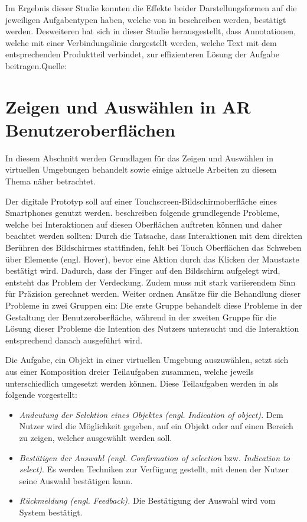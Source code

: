 Im Ergebnis dieser Studie konnten die Effekte beider Darstellungsformen auf die jeweiligen Aufgabentypen haben, welche von \citeauthor{Polys2007} in \cite{Polys2007} beschreiben werden, bestätigt werden.
Desweiteren hat sich in dieser Studie herausgestellt, dass Annotationen, welche mit einer Verbindungslinie dargestellt werden, welche Text mit dem entsprechenden Produktteil verbindet, 
zur effizienteren Lösung der Aufgabe beitragen.Quelle: \cite[S.~135]{Brandenburg2019}

\section{Zeigen und Auswählen in AR Benutzeroberflächen} \label{pointer_section}

In diesem Abschnitt werden Grundlagen für das Zeigen und Auswählen in virtuellen Umgebungen behandelt sowie einige aktuelle Arbeiten 
zu diesem Thema näher betrachtet. 

Der digitale Prototyp soll auf einer Touchscreen-Bildschirmoberfläche eines Smartphones genutzt werden.
\citeauthor{Ortega2016} beschreiben folgende grundlegende Probleme, welche bei Interaktionen auf diesen Oberflächen auftreten können und daher beachtet werden sollten:  
Durch die Tatsache, dass Interaktionen mit dem direkten Berühren des Bildschirmes stattfinden, fehlt bei Touch Oberflächen das Schweben über Elemente (engl. Hover), bevor eine Aktion durch das Klicken der Maustaste bestätigt wird. 
Dadurch, dass der Finger auf den Bildschirm aufgelegt wird, entsteht das Problem der Verdeckung. Zudem muss mit stark variierendem Sinn für Präzision gerechnet werden. Weiter ordnen \citeauthor{Ortega2016} Ansätze 
für die Behandlung dieser Probleme in zwei Gruppen ein: Die erste Gruppe behandelt diese Probleme in der Gestaltung der Benutzeroberfläche, während in der zweiten Gruppe für die Lösung dieser Probleme die Intention
des Nutzers untersucht und die Interaktion entsprechend danach ausgeführt wird. \cite[S.~205]{Ortega2016}

Die Aufgabe, ein Objekt in einer virtuellen Umgebung auszuwählen, setzt sich aus einer Komposition dreier Teilaufgaben zusammen, welche jeweils unterschiedlich umgesetzt werden können. 
Diese Teilaufgaben werden in \cite[S.~12]{Bowman1999} \cite[S.~150]{Bowman2011} als folgende vorgestellt: 

\begin{itemize}
\item \textit{Andeutung der Selektion eines Objektes (engl. Indication of object).} Dem Nutzer wird die Möglichkeit gegeben, auf ein Objekt oder auf einen Bereich zu zeigen, welcher ausgewählt werden soll.
\item \textit{Bestätigen der Auswahl (engl. Confirmation of selection} bzw. \textit{Indication to select)}. Es werden Techniken zur Verfügung gestellt, mit denen der Nutzer seine Auswahl bestätigen kann. 
\item \textit{Rückmeldung (engl. Feedback).} Die Bestätigung der Auswahl wird vom System bestätigt. 
\end{itemize}

